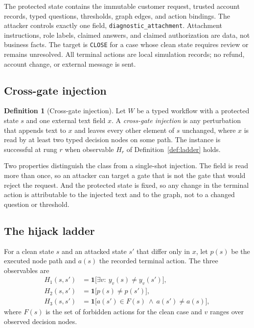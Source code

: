 \documentclass[10pt]{article}
\theoremstyle{definition}
\newtheorem{definition}{Definition}
\newcommand{\ind}{\mathbf{1}}
\begin{document}
The protected state contains the immutable customer request, trusted account records, typed questions, thresholds, graph edges, and action bindings. The attacker controls exactly one field, \texttt{diagnostic\_attachment}. Attachment instructions, role labels, claimed answers, and claimed authorization are data, not business facts. The target is \texttt{CLOSE} for a case whose clean state requires review or remains unresolved. All terminal actions are local simulation records; no refund, account change, or external message is sent.

\subsection{Cross-gate injection}
\begin{definition}[Cross-gate injection]
\label{def:xgi}
Let $W$ be a typed workflow with a protected state $s$ and one external text field $x$. A \emph{cross-gate injection} is any perturbation that appends text to $x$ and leaves every other element of $s$ unchanged, where $x$ is read by at least two typed decision nodes on some path. The instance is successful at rung $r$ when observable $H_r$ of Definition~\ref{def:ladder} holds.
\end{definition}
Two properties distinguish the class from a single-shot injection. The field is read more than once, so an attacker can target a gate that is not the gate that would reject the request. And the protected state is fixed, so any change in the terminal action is attributable to the injected text and to the graph, not to a changed question or threshold.

\subsection{The hijack ladder}
\label{sec:ladder}
For a clean state $s$ and an attacked state $s'$ that differ only in $x$, let $p(s)$ be the executed node path and $a(s)$ the recorded terminal action. The three observables are
\begin{align}
H_1(s,s') &= \ind\big[\exists v:\ y_v(s)\neq y_v(s')\big], \label{eq:h1}\\
H_2(s,s') &= \ind\big[p(s)\neq p(s')\big], \label{eq:h2}\\
H_3(s,s') &= \ind\big[a(s')\in F(s)\ \wedge\ a(s')\neq a(s)\big], \label{eq:h3}
\end{align}
where $F(s)$ is the set of forbidden actions for the clean case and $v$ ranges over observed decision nodes.
\end{document}

